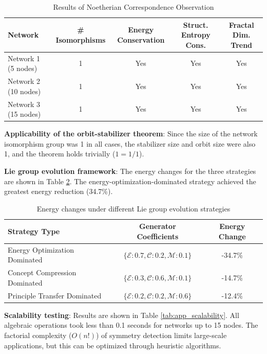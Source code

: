 \documentclass[10pt,onecolumn]{article}
\begin{document}
\begin{table}[H]
\footnotesize
\centering
\caption{Results of Noetherian Correspondence Observation}
\label{tab:app_noether}
\begin{tabular}{lcccc}
\toprule
\textbf{Network} & \textbf{\# Isomorphisms} & \textbf{Energy Conservation} & \textbf{Struct. Entropy Cons.} & \textbf{Fractal Dim. Trend} \\
\midrule
Network 1 (5 nodes) & 1 & Yes & Yes & Yes \\
Network 2 (10 nodes) & 1 & Yes & Yes & Yes \\
Network 3 (15 nodes) & 1 & Yes & Yes & Yes \\
\bottomrule
\end{tabular}
\end{table}

\textbf{Applicability of the orbit-stabilizer theorem}: Since the size of the network isomorphism group was 1 in all cases, the stabilizer size and orbit size were also 1, and the theorem holds trivially ($1 = 1/1$).

\textbf{Lie group evolution framework}: The energy changes for the three strategies are shown in Table \ref{tab:app_lie}. The energy-optimization-dominated strategy achieved the greatest energy reduction (34.7\%).

\begin{table}[H]
\footnotesize
\centering
\caption{Energy changes under different Lie group evolution strategies}
\label{tab:app_lie}
\begin{tabular}{lcc}
\toprule
\textbf{Strategy Type} & \textbf{Generator Coefficients} & \textbf{Energy Change} \\
\midrule
Energy Optimization Dominated & $\{\mathcal{E}:0.7, \mathcal{C}:0.2, \mathcal{M}:0.1\}$ & -34.7\% \\
Concept Compression Dominated & $\{\mathcal{E}:0.3, \mathcal{C}:0.6, \mathcal{M}:0.1\}$ & -14.7\% \\
Principle Transfer Dominated & $\{\mathcal{E}:0.2, \mathcal{C}:0.2, \mathcal{M}:0.6\}$ & -12.4\% \\
\bottomrule
\end{tabular}
\end{table}

\textbf{Scalability testing}: Results are shown in Table \ref{tab:app_scalability}. All algebraic operations took less than 0.1 seconds for networks up to 15 nodes. The factorial complexity ($O(n!)$) of symmetry detection limits large-scale applications, but this can be optimized through heuristic algorithms.
\end{document}

